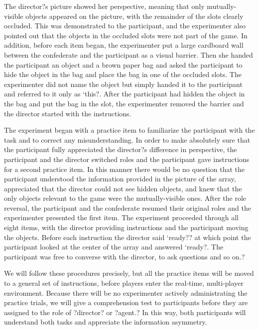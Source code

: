 \documentclass[10pt,letterpaper]{article}
\begin{document}
The director?s picture showed her perspective, meaning that only mutually-visible objects appeared on the picture, with the remainder of the slots clearly occluded. This was demonstrated to the participant, and the experimenter also pointed out that the objects in the occluded slots were not part of the game. In addition, before each item began, the experimenter put a large cardboard wall between the confederate and the participant as a visual barrier. Then she handed the participant an object and a brown paper bag and asked the participant to hide the object in the bag and place the bag in one of the occluded slots. The experimenter did not name the object but simply handed it to the participant and referred to it only as `this?. After the participant had hidden the object in the bag and put the bag in the slot, the experimenter removed the barrier and the director started with the instructions.

The experiment began with a practice item to familiarize the participant with the task and to correct any misunderstanding. In order to make absolutely sure that the participant fully appreciated the director?s difference in perspective, the participant and the director switched roles and the participant gave instructions for a second practice item. In this manner there would be no question that the participant understood the information provided in the picture of the array, appreciated that the director could not see hidden objects, and knew that the only objects relevant to the game were the mutually-visible ones. After the role reversal, the participant and the confederate resumed their original roles and the experimenter presented the first item. The experiment proceeded through all eight items, with the director providing instructions and the participant moving the objects. Before each instruction the director said `ready?? at which point the participant looked at the center of the array and answered `ready?. The participant was free to converse with the director, to ask questions and so on.?
	
We will follow these procedures precisely, but all the practice items will be moved to a general set of instructions, before players enter the real-time, multi-player environment. Because there will be no experimenter actively administrating the practice trials, we will give a comprehension test to participants before they are assigned to the role of ?director? or ?agent.? In this way, both participants will understand both tasks and appreciate the information asymmetry.
\end{document}
